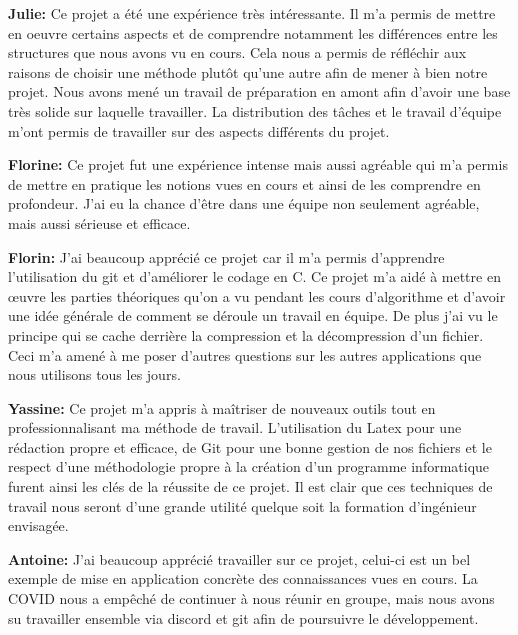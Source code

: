 \documentclass{article}
\begin{document}
    \textbf{Julie:}
        Ce projet a été une expérience très intéressante. Il m'a permis de mettre en oeuvre certains aspects et de comprendre notamment les différences entre les structures que nous avons vu en cours. Cela nous a permis de réfléchir aux raisons de choisir une méthode plutôt qu'une autre afin de mener à bien notre projet. Nous avons mené un travail de préparation en amont afin d'avoir une base très solide sur laquelle travailler. La distribution des tâches et le travail d'équipe m'ont permis de travailler sur des aspects différents du projet.
    \medskip

    \textbf{Florine:}
        Ce projet fut une expérience intense mais aussi agréable qui m'a permis de mettre en pratique les notions vues en cours et ainsi de les comprendre en profondeur. J'ai eu la chance d'être dans une équipe non seulement agréable, mais aussi sérieuse et efficace.
    \medskip

    \textbf{Florin:}
        J’ai beaucoup apprécié ce projet car il m’a permis d’apprendre l’utilisation du git et d’améliorer le codage en C. Ce projet m’a aidé à mettre en œuvre les parties théoriques qu’on a vu pendant les cours d’algorithme et d’avoir une idée générale de comment se déroule un travail en équipe. De plus j’ai vu le principe qui se cache derrière la compression et la décompression d’un fichier. Ceci m’a amené à me poser d’autres questions sur les autres applications que nous utilisons tous les jours. 
    \medskip

    \textbf{Yassine:}
        Ce projet m'a appris à maîtriser de nouveaux outils tout en professionnalisant ma méthode de travail. L'utilisation du Latex pour une rédaction propre et efficace, de Git pour une bonne gestion de nos fichiers et le respect d'une méthodologie propre à la création d'un programme informatique furent ainsi les clés de la réussite de ce projet. Il est clair que ces techniques de travail nous seront d'une grande utilité quelque soit la formation d'ingénieur envisagée.
    \medskip

    \textbf{Antoine:}
        J'ai beaucoup apprécié travailler sur ce projet, celui-ci est un bel exemple de mise en application concrète des connaissances vues en cours. La COVID nous a empêché de continuer à nous réunir en groupe, mais nous avons su travailler ensemble via discord et git afin de poursuivre le développement. 

\clearpage %
\end{document}
